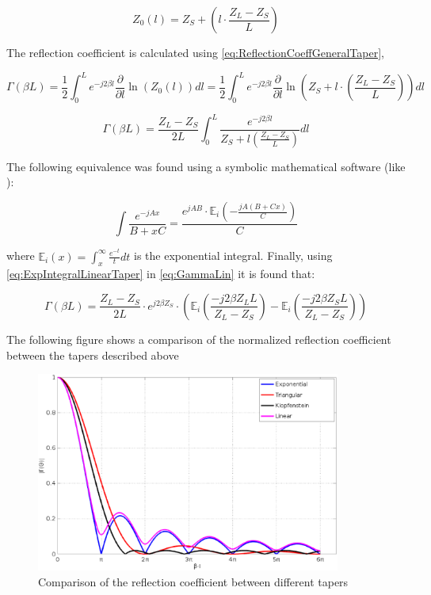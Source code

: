 \begin{equation}
Z_0(l) = Z_S + \left( l \cdot \frac{Z_L - Z_S}{L} \right)
\end{equation}

\noindent The reflection coefficient is calculated using \ref{eq:ReflectionCoeffGeneralTaper},

\begin{equation}
\Gamma(\beta L) = \frac{1}{2} \int_0^L e^{-j2 \beta l} \frac{\partial}{\partial l} \ln (Z_0 (l)) dl = \frac{1}{2} \int_{0}^L e^{-j2\beta l} \frac{\partial}{\partial l} \ln \left( Z_S + l \cdot \left( \frac{Z_L - Z_S}{L}\right) \right) dl
\end{equation}

\begin{equation}
\Gamma(\beta L) = \frac{Z_L - Z_S}{2 L } \int_0^L \frac{e^{-j2 \beta l}}{Z_S + l \left( \frac{Z_L - Z_S}{L}\right)} dl
\label{eq:GammaLin}
\end{equation}

\noindent The following equivalence was found using a symbolic mathematical software (like \cite{SageMath}):

\begin{equation}
 \int \frac{e^{-jAx}}{B+xC} = \frac{e^{jA B} \cdot \mathbb{E}_i \left( -\frac{jA(B+Cx)}{C}\right)}{C}
 \label{eq:ExpIntegralLinearTaper}
\end{equation}

\noindent where $\mathbb{E}_i(x) = \int_{x}^{\infty} \frac{e^{-t}}{t} dt$ is the exponential integral. Finally, using \ref{eq:ExpIntegralLinearTaper} in \ref{eq:GammaLin} it is found that:

\begin{equation}
 \Gamma(\beta L) = \frac{Z_L - Z_S}{2 L} \cdot e^{j 2 \beta Z_S} \cdot \left( \mathbb{E}_i \left( \frac{-j 2 \beta Z_L L}{Z_L-Z_S}\right) - \mathbb{E}_i \left( \frac{-j2 \beta Z_S L}{Z_L - Z_S}\right)\right)
\end{equation}

\vskip 5mm
\noindent The following figure shows a comparison of the normalized reflection coefficient between the tapers described above

\begin{figure}[H]
\centering
\includegraphics[width=100mm]{ReflectionCoeffsTaper}
\caption{Comparison of the reflection coefficient between different tapers}
\label{fig:ReflectionCoeffTapers}
\end{figure}



